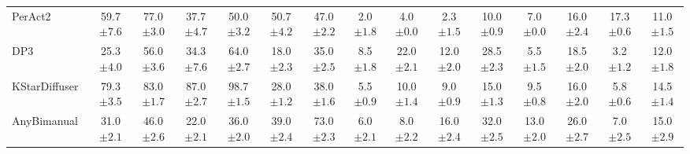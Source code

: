 \begin{table}[ht]
{\begin{tabular}{l|cc|cc|cc|cc|cc|cc|cc}
    PerAct2~\cite{grotz2024peract2} & 59.7\textcolor[gray]{0.5}{\small{$\pm7.6$}} & 77.0\textcolor[gray]{0.5}{\small{$\pm3.0$}} & 37.7\textcolor[gray]{0.5}{\small{$\pm4.7$}} & 50.0\textcolor[gray]{0.5}{\small{$\pm3.2$}} & 50.7\textcolor[gray]{0.5}{\small{$\pm4.2$}} & 47.0\textcolor[gray]{0.5}{\small{$\pm2.2$}} & 2.0\textcolor[gray]{0.5}{\small{$\pm1.8$}} & 4.0\textcolor[gray]{0.5}{\small{$\pm0.0$}} & 2.3\textcolor[gray]{0.5}{\small{$\pm1.5$}} & 10.0\textcolor[gray]{0.5}{\small{$\pm0.9$}} & 7.0\textcolor[gray]{0.5}{\small{$\pm0.0$}} & 16.0\textcolor[gray]{0.5}{\small{$\pm2.4$}} & 17.3\textcolor[gray]{0.5}{\small{$\pm0.6$}} & 11.0\textcolor[gray]{0.5}{\small{$\pm1.5$}} \\
    DP3~\cite{ze20243d}  & 25.3\textcolor[gray]{0.5}{\small{$\pm4.0$}} & 56.0\textcolor[gray]{0.5}{\small{$\pm3.6$}} & 34.3\textcolor[gray]{0.5}{\small{$\pm7.6$}} & 64.0\textcolor[gray]{0.5}{\small{$\pm2.7$}} & 18.0\textcolor[gray]{0.5}{\small{$\pm2.3$}} & 35.0\textcolor[gray]{0.5}{\small{$\pm2.5$}} & 8.5\textcolor[gray]{0.5}{\small{$\pm1.8$}} & 22.0\textcolor[gray]{0.5}{\small{$\pm2.1$}} & 12.0\textcolor[gray]{0.5}{\small{$\pm2.0$}} & 28.5\textcolor[gray]{0.5}{\small{$\pm2.3$}} & 5.5\textcolor[gray]{0.5}{\small{$\pm1.5$}} & 18.5\textcolor[gray]{0.5}{\small{$\pm2.0$}} & 3.2\textcolor[gray]{0.5}{\small{$\pm1.2$}} & 12.0\textcolor[gray]{0.5}{\small{$\pm1.8$}} \\
    KStarDiffuser~\cite{lv2025spatial} & 79.3\textcolor[gray]{0.5}{\small{$\pm3.5$}} & 83.0\textcolor[gray]{0.5}{\small{$\pm1.7$}} & 87.0\textcolor[gray]{0.5}{\small{$\pm2.7$}} & 98.7\textcolor[gray]{0.5}{\small{$\pm1.5$}} & 28.0\textcolor[gray]{0.5}{\small{$\pm1.2$}} & 38.0\textcolor[gray]{0.5}{\small{$\pm1.6$}} & 5.5\textcolor[gray]{0.5}{\small{$\pm0.9$}} & 10.0\textcolor[gray]{0.5}{\small{$\pm1.4$}} & 9.0\textcolor[gray]{0.5}{\small{$\pm0.9$}} & 15.0\textcolor[gray]{0.5}{\small{$\pm1.3$}} & 9.5\textcolor[gray]{0.5}{\small{$\pm0.8$}} & 16.0\textcolor[gray]{0.5}{\small{$\pm2.0$}} & 5.8\textcolor[gray]{0.5}{\small{$\pm0.6$}} & 14.5\textcolor[gray]{0.5}{\small{$\pm1.4$}} \\
    AnyBimanual~\cite{lu2025anybimanual} & 31.0\textcolor[gray]{0.5}{\small{$\pm2.1$}} & 46.0\textcolor[gray]{0.5}{\small{$\pm2.6$}} & 22.0\textcolor[gray]{0.5}{\small{$\pm2.1$}} & 36.0\textcolor[gray]{0.5}{\small{$\pm2.0$}} & 39.0\textcolor[gray]{0.5}{\small{$\pm2.4$}} & 73.0\textcolor[gray]{0.5}{\small{$\pm2.3$}} & 6.0\textcolor[gray]{0.5}{\small{$\pm2.1$}} & 8.0\textcolor[gray]{0.5}{\small{$\pm2.2$}} & 16.0\textcolor[gray]{0.5}{\small{$\pm2.4$}} & 32.0\textcolor[gray]{0.5}{\small{$\pm2.5$}} & 13.0\textcolor[gray]{0.5}{\small{$\pm2.0$}} & 26.0\textcolor[gray]{0.5}{\small{$\pm2.7$}} & 7.0\textcolor[gray]{0.5}{\small{$\pm2.5$}} & 15.0\textcolor[gray]{0.5}{\small{$\pm2.9$}} \\

\end{tabular}}
\end{table}
